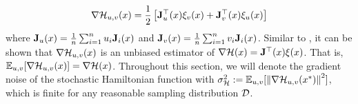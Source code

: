 \documentclass{article}
\begin{document}
\vspace{-4mm}
 \begin{eqnarray}
 \label{StochasticHamiltonianGradient}
\nabla {\cal H}_{u,v}(x)=\frac{1}{2} \left[ \mathbf{J}_u^\top(x) \xi_v(x) +   \mathbf{J}_v^\top(x) \xi_u(x) \right]
\end{eqnarray}
where  $\mathbf{J}_u(x)= \frac{1}{n}\sum_{i=1}^n u_i \mathbf{J}_i(x)$ and $\mathbf{J}_v(x)= \frac{1}{n}\sum_{i=1}^n v_i \mathbf{J}_i(x)$.
Similar to \cite{loizou2020stochastic}, it can be shown that $\nabla {\cal H}_{u,v}(x)$  is an unbiased estimator of $\nabla {\cal H}(x)=\mathbf{J}^\top(x) \xi(x)$. That is, $\mathbb{E}_{u,v} [\nabla {\cal H}_{u,v}(x)]=\nabla {\cal H}(x)$.
Throughout this section, we will denote the gradient noise of the stochastic Hamiltonian function with $\sigma_{{\cal H}}^2  := \mathbb{E}_{u,v}[\left\| \nabla {\cal H}_{u,v}(x^*)\right\|^2]$, which is finite for any reasonable sampling distribution ${\cal D}$.
\end{document}
